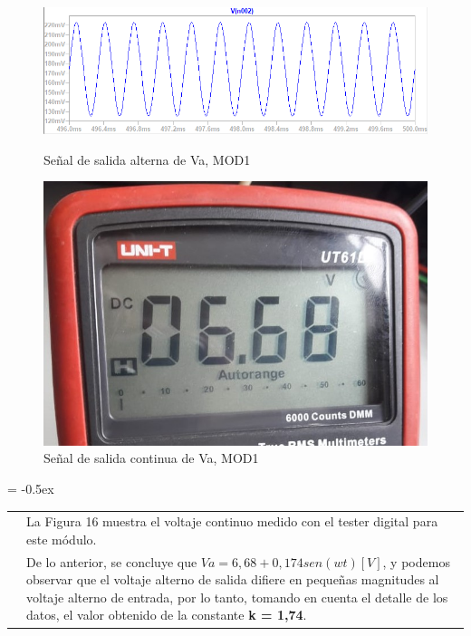 \begin{figure}[H]
\centering
\begin{minipage}[c]{0.4\linewidth}
\centering
    \includegraphics[scale=0.25]{Imagenes/7Resultados/Va.PNG}
    \caption{Señal de salida alterna de Va, MOD1}
    \label{fig:figura14}
\end{minipage}
\hspace{1.7cm}
\begin{minipage}[c]{0.4\linewidth}
\centering
    \includegraphics[scale=0.15]{Imagenes/7Resultados/Vcc.jpeg}
    \caption{Señal de salida continua de Va, MOD1}
    \label{fig:figura15}
\end{minipage}
\end{figure}

\centering
\extrarowheight = -0.5ex
\renewcommand{\arraystretch}{2.25}
\begin{tabular}{p{} p{}}
& La Figura 16 muestra el voltaje continuo medido con el tester digital para este módulo. \\
& De lo anterior, se concluye que $Va = 6,68 + 0,174sen(wt)[V]$, y podemos observar que el voltaje alterno de salida difiere en pequeñas magnitudes al voltaje alterno de entrada, por lo tanto, tomando en cuenta el detalle de los datos, el valor obtenido de la constante \textbf{k = 1,74}. 
\\
\end{tabular}
\vspace{0.6cm}

